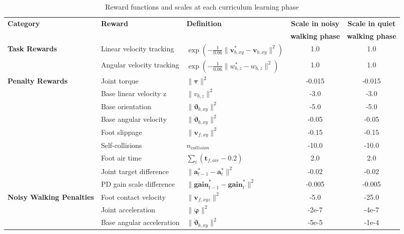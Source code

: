 \begin{table*}
\caption{Reward functions and scales at each curriculum learning phase}
\label{table:reward}
\begin{center}
\begin{tabular}{lllcc}
\toprule
\textbf{Category} & \textbf{Reward} & \textbf{Definition} & \textbf{Scale in noisy} & \textbf{Scale in quiet} \\
 & & & \textbf{walking phase} & \textbf{walking phase} \\
\midrule
\multirow{2}{*}{\textbf{Task Rewards}} & Linear velocity tracking & $\exp(-\frac{1}{0.06}\|\mathbf{v}_{b,xy}^* - \mathbf{v}_{b,xy}\|^2 )$ & 1.0 & 1.0  \\
 & Angular velocity tracking & $\exp(-\frac{1}{0.06}\|{w}_{b,z}^* - {w}_{b,z}\|^2)$ & 1.0 & 1.0 \\
\midrule
\multirow{8}{*}{\textbf{Penalty Rewards}} & Joint torque & $\|\boldsymbol{\tau}\|^2$ & -0.015 & -0.015  \\
 & Base linear velocity z & $\|v_{b,z}\|^2$ & -3.0 & -3.0 \\
 & Base orientation & $\|\boldsymbol{\vartheta}_{b,xy}\|^2$ & -5.0 & -5.0 \\
 & Base angular velocity & $\|\boldsymbol{\dot\vartheta}_{b,xy}\|^2$ & -0.05 & -0.05 \\
 & Foot slippage & $\|\boldsymbol{v}_{f,xy}\|^2$ & -0.15 & -0.15 \\
 & Self-collisions & $n_{collision}$ & -10.0 & -10.0 \\
 & Foot air time & $\sum_i (\boldsymbol{t}_{f,air} - 0.2)$ & 2.0 & 2.0 \\
 & Joint target difference & $\|\boldsymbol{a}^*_{t-1} - \boldsymbol{a}^*_{t}\|^2$ & -0.02 & -0.02 \\
 & PD gain scale difference & $\|\boldsymbol{gain}^*_{t-1} - \boldsymbol{gain}^*_{t}\|^2$ & -0.005 & -0.005 \\
\midrule
\multirow{3}{*}{\textbf{Noisy Walking Penalties}}  & Foot contact velocity & $\|\boldsymbol{v}_{f,xyz}\|^2$ & -5.0 & -25.0 \\
& Joint acceleration & $\|\boldsymbol{\ddot\varphi}\|^2$ & -2e-7 & -4e-7 \\
 & Base angular acceleration & $\|\boldsymbol{\ddot\vartheta}_{b,xy}\|^2$ & -5e-5 & -1e-4 \\
\bottomrule
\end{tabular}
\end{center}
\end{table*}

